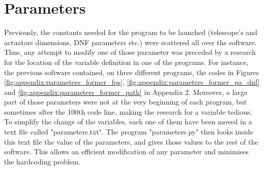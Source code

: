 \section{Parameters}  \label{parameters}

Previously, the constants needed for the program to be launched (telescope's and actuators dimensions, DNF parameters etc.) were scattered all over the software. Thus, any attempt to modify one of those parameter was preceded by a research for the location of the variable definition in one of the programs. For instance, the previous software contained, on three different programs, the codes in Figures  \ref{fig:appendix:parameters_former_fps}, \ref{fig:appendix:parameters_former_pa_dnf} and \ref{fig:appendix:parameters_former_path} in Appendix 2. Moreover, a large part of those parameters were not at the very beginning of each program, but sometimes after the 100th code line, making the research for a variable tedious. \\

To simplify the change of the variables, each one of them have been moved in a text file called "parameters.txt". The program "parameters.py" then looks inside this text file the value of the parameters, and gives those values to the rest of the software. This allows an efficient modification of any parameter and minimises the hardcoding problem.